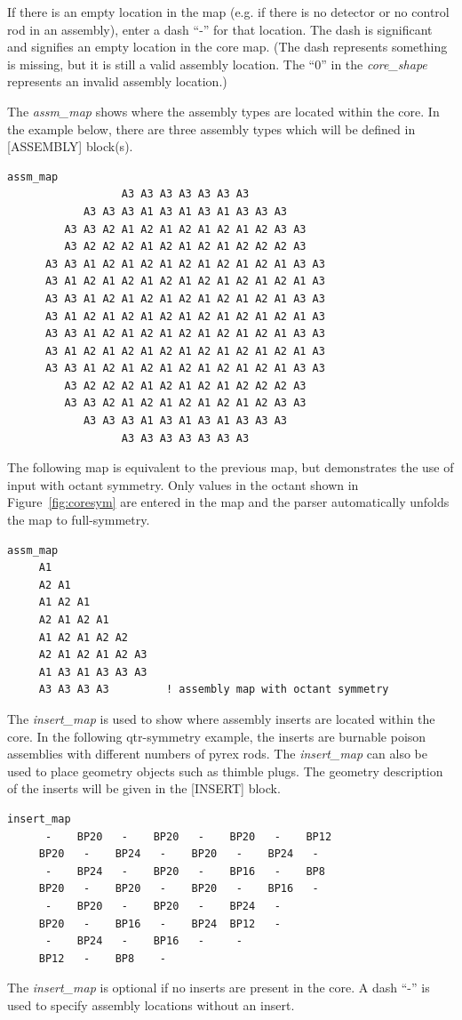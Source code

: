 If there is an empty location in the map (e.g. if there is no detector or no control rod
in an assembly), enter a dash ``-'' for that location.  The dash is significant and signifies an
empty location in the core map.  (The dash represents something is missing, but it is still
a valid assembly location. The ``0'' in the {\it core\_shape} represents an invalid assembly location.)


\clearpage

The {\it assm\_map} shows where the assembly types are located within the core.
In the example below, there are three assembly types which will be defined in [ASSEMBLY] block(s).
\begin{Verbatim}[fontsize=\small]
  assm_map
                  A3 A3 A3 A3 A3 A3 A3
            A3 A3 A3 A1 A3 A1 A3 A1 A3 A3 A3
         A3 A3 A2 A1 A2 A1 A2 A1 A2 A1 A2 A3 A3
         A3 A2 A2 A2 A1 A2 A1 A2 A1 A2 A2 A2 A3
      A3 A3 A1 A2 A1 A2 A1 A2 A1 A2 A1 A2 A1 A3 A3
      A3 A1 A2 A1 A2 A1 A2 A1 A2 A1 A2 A1 A2 A1 A3
      A3 A3 A1 A2 A1 A2 A1 A2 A1 A2 A1 A2 A1 A3 A3
      A3 A1 A2 A1 A2 A1 A2 A1 A2 A1 A2 A1 A2 A1 A3
      A3 A3 A1 A2 A1 A2 A1 A2 A1 A2 A1 A2 A1 A3 A3
      A3 A1 A2 A1 A2 A1 A2 A1 A2 A1 A2 A1 A2 A1 A3
      A3 A3 A1 A2 A1 A2 A1 A2 A1 A2 A1 A2 A1 A3 A3
         A3 A2 A2 A2 A1 A2 A1 A2 A1 A2 A2 A2 A3
         A3 A3 A2 A1 A2 A1 A2 A1 A2 A1 A2 A3 A3
            A3 A3 A3 A1 A3 A1 A3 A1 A3 A3 A3
                  A3 A3 A3 A3 A3 A3 A3
\end{Verbatim}

The following map is equivalent to the previous map, but demonstrates the use of input with octant symmetry.
Only values in the octant shown in Figure~\ref{fig:coresym} are entered in the map and the parser automatically
unfolds the map to full-symmetry.
\begin{Verbatim}[fontsize=\small]
  assm_map
     A1
     A2 A1
     A1 A2 A1
     A2 A1 A2 A1
     A1 A2 A1 A2 A2
     A2 A1 A2 A1 A2 A3
     A1 A3 A1 A3 A3 A3
     A3 A3 A3 A3         ! assembly map with octant symmetry
\end{Verbatim}

The {\it insert\_map} is used to show where assembly inserts are located within the core.
In the following qtr-symmetry example,
the inserts are burnable poison assemblies with different numbers of pyrex rods.
The {\it insert\_map} can also be used to place geometry objects such as thimble plugs.
The geometry description of the inserts will be given in the [INSERT] block.
\begin{Verbatim}[fontsize=\small]
  insert_map
      -    BP20   -    BP20   -    BP20   -    BP12
     BP20   -    BP24   -    BP20   -    BP24   -
      -    BP24   -    BP20   -    BP16   -    BP8
     BP20   -    BP20   -    BP20   -    BP16   -
      -    BP20   -    BP20   -    BP24   -
     BP20   -    BP16   -    BP24  BP12   -
      -    BP24   -    BP16   -     -
     BP12   -    BP8    -
\end{Verbatim}
The {\it insert\_map} is optional if no inserts are present in the core.
A dash ``-'' is used to specify assembly locations without an insert.

